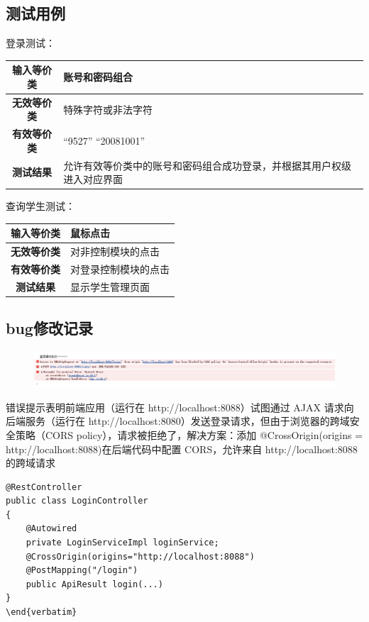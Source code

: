 \documentclass{article}
\begin{document}
\subsection{测试用例}
登录测试：

\begin{centering}
\begin{longtable}{|c|m{11cm}<{\centering}|} \hline
\textbf{输入等价类} & 账号和密码组合 \\ \hline
\textbf{无效等价类} & 特殊字符或非法字符 \\ \hline
\textbf{有效等价类} & “9527” “20081001”\\ \hline
\textbf{测试结果} & 允许有效等价类中的账号和密码组合成功登录，并根据其用户权级进入对应界面 \\ \hline
\end{longtable}
\end{centering}

查询学生测试：

\begin{centering}
\begin{longtable}{|c|m{11cm}<{\centering}|} \hline
\textbf{输入等价类} & 鼠标点击 \\ \hline
\textbf{无效等价类} & 对非控制模块的点击 \\ \hline
\textbf{有效等价类} & 对登录控制模块的点击 \\ \hline
\textbf{测试结果} & 显示学生管理页面 \\ \hline
\end{longtable}
\end{centering}

\subsection{bug修改记录}

\begin{figure}[H]
    \centering
    \includegraphics[width=0.9\linewidth]{错误.png}
\end{figure}
错误提示表明前端应用（运行在 http://localhost:8088）试图通过 AJAX 请求向后端服务（运行在 http://localhost:8080）发送登录请求，但由于浏览器的跨域安全策略（CORS policy），请求被拒绝了，解决方案：添加 @CrossOrigin(origins = http://localhost:8088)在后端代码中配置 CORS，允许来自 http://localhost:8088 的跨域请求
\begin{lstlisting}
@RestController
public class LoginController
{
    @Autowired
    private LoginServiceImpl loginService;
    @CrossOrigin(origins="http://localhost:8088")
    @PostMapping("/login")
    public ApiResult login(...)
}
\end{verbatim}
\end{lstlisting}
\end{document}
